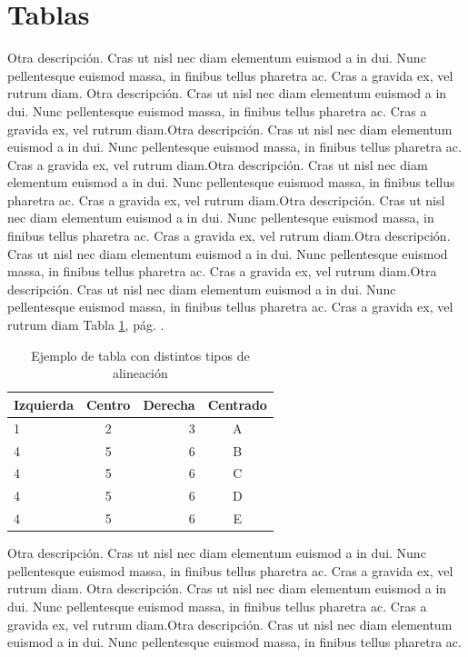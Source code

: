 \documentclass[b5paper, 10pt]{book}
\begin{document}
\section{Tablas}
Otra descripción. Cras ut nisl nec diam elementum euismod a in dui. Nunc pellentesque euismod massa, in finibus tellus pharetra ac. Cras a gravida ex, vel rutrum diam. Otra descripción. Cras ut nisl nec diam elementum euismod a in dui. Nunc pellentesque euismod massa, in finibus tellus pharetra ac. Cras a gravida ex, vel rutrum diam.Otra descripción. Cras ut nisl nec diam elementum euismod a in dui. Nunc pellentesque euismod massa, in finibus tellus pharetra ac. Cras a gravida ex, vel rutrum diam.Otra descripción. Cras ut nisl nec diam elementum euismod a in dui. Nunc pellentesque euismod massa, in finibus tellus pharetra ac. Cras a gravida ex, vel rutrum diam.Otra descripción. Cras ut nisl nec diam elementum euismod a in dui. Nunc pellentesque euismod massa, in finibus tellus pharetra ac. Cras a gravida ex, vel rutrum diam.Otra descripción. Cras ut nisl nec diam elementum euismod a in dui. Nunc pellentesque euismod massa, in finibus tellus pharetra ac. Cras a gravida ex, vel rutrum diam.Otra descripción. Cras ut nisl nec diam elementum euismod a in dui. Nunc pellentesque euismod massa, in finibus tellus pharetra ac. Cras a gravida ex, vel rutrum diam Tabla \ref{tab:alineación}, pág. \pageref{tab:alineación}.

\begin{table}[htbp]
	\centering
	\caption{Ejemplo de tabla con distintos tipos de alineación}
	\label{tab:alineación}
	\begin{tabular}{|lcrc|}
		\hline
		Izquierda & Centro & Derecha  & Centrado  \\
		\hline
		\hline
		1 & 2 & 3 & A\\
		4 & 5 & 6 & B \\
			4 & 5 & 6 & C \\
				4 & 5 & 6 & D \\
					4 & 5 & 6 &E \\
		\hline
	\end{tabular}
	
\end{table}	

Otra descripción. Cras ut nisl nec diam elementum euismod a in dui. Nunc pellentesque euismod massa, in finibus tellus pharetra ac. Cras a gravida ex, vel rutrum diam. Otra descripción. Cras ut nisl nec diam elementum euismod a in dui. Nunc pellentesque euismod massa, in finibus tellus pharetra ac. Cras a gravida ex, vel rutrum diam.Otra descripción. Cras ut nisl nec diam elementum euismod a in dui. Nunc pellentesque euismod massa, in finibus tellus pharetra ac.
\end{document}
